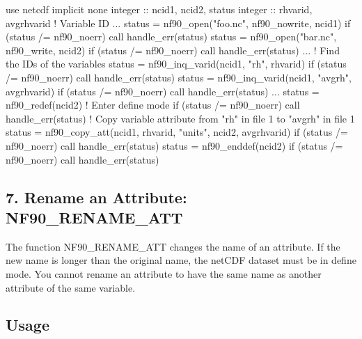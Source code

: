 \begin{DoxyCode}
\textcolor{keywordtype}{use }netcdf
\textcolor{keywordtype}{implicit none}
\textcolor{keywordtype}{integer} :: ncid1, ncid2, status
\textcolor{keywordtype}{integer} :: rhvarid, avgrhvarid    \textcolor{comment}{! Variable ID}
...
status = nf90\_open(\textcolor{stringliteral}{"foo.nc"}, nf90\_nowrite, ncid1)
\textcolor{keywordflow}{if} (status /= nf90\_noerr) \textcolor{keyword}{call }handle\_err(status)
status = nf90\_open(\textcolor{stringliteral}{"bar.nc"}, nf90\_write, ncid2)
\textcolor{keywordflow}{if} (status /= nf90\_noerr) \textcolor{keyword}{call }handle\_err(status)
...
\textcolor{comment}{! Find the IDs of the variables}
status = nf90\_inq\_varid(ncid1, \textcolor{stringliteral}{"rh"}, rhvarid)
\textcolor{keywordflow}{if} (status /= nf90\_noerr) \textcolor{keyword}{call }handle\_err(status)
status = nf90\_inq\_varid(ncid1, \textcolor{stringliteral}{"avgrh"}, avgrhvarid)
\textcolor{keywordflow}{if} (status /= nf90\_noerr) \textcolor{keyword}{call }handle\_err(status)
...
status = nf90\_redef(ncid2)   \textcolor{comment}{! Enter define mode}
\textcolor{keywordflow}{if} (status /= nf90\_noerr) \textcolor{keyword}{call }handle\_err(status)
\textcolor{comment}{! Copy variable attribute from "rh" in file 1 to "avgrh" in file 1}
status = nf90\_copy\_att(ncid1, rhvarid, \textcolor{stringliteral}{"units"}, ncid2, avgrhvarid)
\textcolor{keywordflow}{if} (status /= nf90\_noerr) \textcolor{keyword}{call }handle\_err(status)
status = nf90\_enddef(ncid2)
\textcolor{keywordflow}{if} (status /= nf90\_noerr) \textcolor{keyword}{call }handle\_err(status)
\end{DoxyCode}
\hypertarget{f90-attributes_f90-rename-an-attribute-nf90_rename_att}{}\subsection{7. Rename an Attribute\+: N\+F90\+\_\+\+R\+E\+N\+A\+M\+E\+\_\+\+A\+T\+T }\label{f90-attributes_f90-rename-an-attribute-nf90_rename_att}
The function N\+F90\+\_\+\+R\+E\+N\+A\+M\+E\+\_\+\+A\+TT changes the name of an attribute. If the new name is longer than the original name, the net\+C\+DF dataset must be in define mode. You cannot rename an attribute to have the same name as another attribute of the same variable.

\subsection*{Usage}



